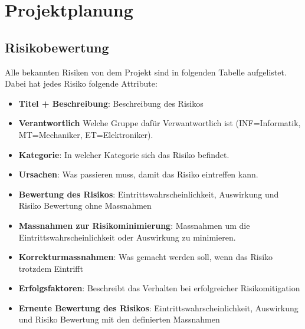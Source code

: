 \newpage
\section{Projektplanung}

\subsection{Risikobewertung}

Alle bekannten Risiken von dem Projekt sind in folgenden Tabelle aufgelistet.
Dabei hat jedes Risiko folgende Attribute:
\begin{itemize}
    \item \textbf{Titel + Beschreibung}: Beschreibung des Risikos
    \item \textbf{Verantwortlich} Welche Gruppe dafür Verwantwortlich ist (INF=Informatik, MT=Mechaniker, ET=Elektroniker).
    \item \textbf{Kategorie}: In welcher Kategorie sich das Risiko befindet.
    \item \textbf{Ursachen}: Was passieren muss, damit das Risiko eintreffen kann.
    \item \textbf{Bewertung des Risikos}: Eintrittswahrscheinlichkeit, Auswirkung und Risiko Bewertung ohne Massnahmen
    \item \textbf{Massnahmen zur Risikominimierung}: Massnahmen um die Eintrittswahrscheinlichkeit oder Auswirkung zu minimieren.
    \item \textbf{Korrekturmassnahmen}: Was gemacht werden soll, wenn das Risiko trotzdem Eintrifft
    \item \textbf{Erfolgsfaktoren}: Beschreibt das Verhalten bei erfolgreicher Risikomitigation
    \item \textbf{Erneute Bewertung des Risikos}: Eintrittswahrscheinlichkeit, Auswirkung und Risiko Bewertung mit den definierten Massnahmen
\end{itemize}
